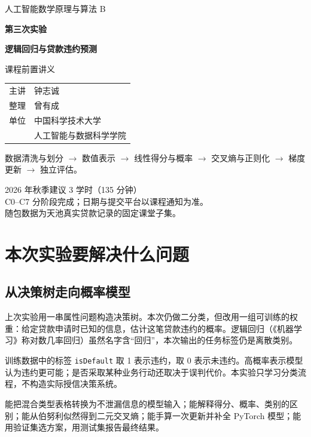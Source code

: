 \documentclass[UTF8,a4paper,11pt,fontset=fandol]{ctexart}
\begin{document}
\hypersetup{pageanchor=false}
\begin{titlepage}
\thispagestyle{empty}
\vspace*{1.4cm}
{\Large\color{Navy}人工智能数学原理与算法 B\par}
\vspace{1.0cm}
{\huge\bfseries\color{Ink}第三次实验\par}
\vspace{.4cm}
{\LARGE\bfseries\color{Navy}逻辑回归与贷款违约预测\par}
\vspace{.8cm}
{\Large 课程前置讲义\par}
\vspace{1.1cm}
\begin{tabular}{@{}ll}
主讲 & 钟志诚\\[.5em]
整理 & 曾有成\\[.5em]
单位 & 中国科学技术大学\\
 & 人工智能与数据科学学院
\end{tabular}
\vspace{1cm}
\begin{keybox}[从数据到可解释的分类流程]
数据清洗与划分 $\rightarrow$ 数值表示 $\rightarrow$ 线性得分与概率
$\rightarrow$ 交叉熵与正则化 $\rightarrow$ 梯度更新 $\rightarrow$ 独立评估。
\end{keybox}
\vfill
2026 年秋季\quad 建议 3 学时（135 分钟）\\
C0--C7 分阶段完成；日期与提交平台以课程通知为准。\\
随包数据为天池真实贷款记录的固定课堂子集。
\end{titlepage}
\hypersetup{pageanchor=true}
\tableofcontents\clearpage{}
\section{本次实验要解决什么问题}
\subsection{从决策树走向概率模型}
上次实验用一串属性问题构造决策树。本次仍做二分类，但改用一组可训练的权重：给定贷款申请时已知的信息，估计这笔贷款违约的概率。逻辑回归（《机器学习》称对数几率回归）虽然名字含“回归”，本次输出的任务标签仍是离散类别。

训练数据中的标签 \texttt{isDefault} 取 1 表示违约，取 0 表示未违约。高概率表示模型认为违约更可能；是否采取某种业务行动还取决于误判代价。本实验只学习分类流程，不构造实际授信决策系统。
\begin{keybox}[学习目标]
能把混合类型表格转换为不泄漏信息的模型输入；能解释得分、概率、类别的区别；能从伯努利似然得到二元交叉熵；能手算一次更新并补全 PyTorch 模型；能用验证集选方案，用测试集报告最终结果。
\end{keybox}
\end{document}
